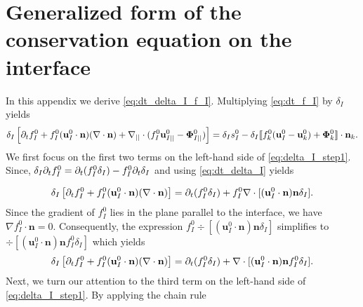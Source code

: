 \section{Generalized form of the conservation equation on the interface}
\label{ap:interface_proof}
In this appendix we derive \ref{eq:dt_delta_I_f_I}. Multiplying \ref{eq:dt_f_I} by $\delta_I$ yields
\begin{equation}
    \delta_I
    \left[ \partial_t f_I^0 
    + f_I^0 (\textbf{u}_{I}^0\cdot \textbf{n})  (\mathbf{\nabla}\cdot \textbf{n})
    +\mathbf{\nabla}_{||}\cdot
    (f_I^0 \textbf{u}_{I||}^0
    - \mathbf{\Phi}_{I||}^0 )
    \right]
    = \delta_Is_I^0
    - \delta_I\llbracket 
    f_k^0 (\textbf{u}_I^0 - \textbf{u}_k^0)
    + \mathbf{\Phi}_k^0 \rrbracket \cdot \textbf{n}_k.
    \label{eq:delta_I_step1}
\end{equation}
We first focus on the first two terms on the left-hand side of \ref{eq:delta_I_step1}. Since, $\delta_I\partial_t f_I^0 = \partial_t (f_I^0\delta_I) - f_I^0\partial_t\delta_I$ and using \ref{eq:dt_delta_I} yields

\begin{equation}
\delta_I
    \left[ \partial_t f_I^0 
    + f_I^0 (\textbf{u}_{I}^0\cdot \textbf{n})  (\mathbf{\nabla}\cdot \textbf{n}) \right] = \partial_t (f_I^0\delta_I) + f_I^0\mathbf{\nabla}\cdot [(\textbf{u}_I^0\cdot \textbf{n}) \textbf{n}\delta_I ].
\end{equation}
Since the gradient of $f_I^0$ lies in the plane parallel to the interface, we have  $\nabla f_I^0 \cdot \textbf{n} = 0$. Consequently, the expression $f_I^0\div [(\textbf{u}_I^0\cdot \textbf{n}) \textbf{n}\delta_I ]$ simplifies to $\div [(\textbf{u}_I^0\cdot \textbf{n}) \textbf{n}f_I^0\delta_I ]$ which yields 
\begin{equation}
\delta_I
    \left[ \partial_t f_I^0 
    + f_I^0 (\textbf{u}_{I}^0\cdot \textbf{n})  (\mathbf{\nabla}\cdot \textbf{n}) \right] = \partial_t (f_I^0\delta_I) + \mathbf{\nabla}\cdot [(\textbf{u}_I^0\cdot \textbf{n}) \textbf{n}f_I^0\delta_I ].
\label{eq:delta_I_step1_2}
\end{equation}
Next, we turn our attention to the third term on the left-hand side of \ref{eq:delta_I_step1}. By applying the chain rule

